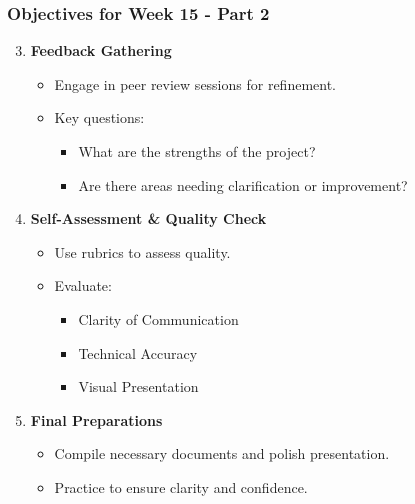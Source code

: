 \documentclass[aspectratio=169]{beamer}
\begin{document}
\begin{frame}[fragile]
    \frametitle{Objectives for Week 15 - Part 2}
    \begin{enumerate}
        \setcounter{enumi}{2}
        \item \textbf{Feedback Gathering}
        \begin{itemize}
            \item Engage in peer review sessions for refinement.
            \item Key questions:
            \begin{itemize}
                \item What are the strengths of the project?
                \item Are there areas needing clarification or improvement?
            \end{itemize}
        \end{itemize}
        \item \textbf{Self-Assessment \& Quality Check}
        \begin{itemize}
            \item Use rubrics to assess quality.
            \item Evaluate:
            \begin{itemize}
                \item Clarity of Communication
                \item Technical Accuracy
                \item Visual Presentation
            \end{itemize}
        \end{itemize}
        \item \textbf{Final Preparations}
        \begin{itemize}
            \item Compile necessary documents and polish presentation.
            \item Practice to ensure clarity and confidence.
        \end{itemize}
    \end{enumerate}
\end{frame}
\end{document}
